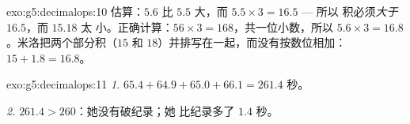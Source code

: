 \begin{solution}{exo:g5:decimalops:10}
估算：$5.6$ 比 $5.5$ 大，而 $5.5 \times 3 = 16.5$ --- 所以
积必须\emph{大于} $16.5$，而 $15.18$ 太
小。正确计算：$56 \times 3 = 168$，共一位小数，所以
$5.6 \times 3 = 16.8$。米洛把两个部分积（$15$ 和
$18$）并排写在一起，而没有按数位相加：
$15 + 1.8 = 16.8$。
\end{solution}

\begin{solution}{exo:g5:decimalops:11}
\emph{1.} $65.4 + 64.9 + 65.0 + 66.1 = 261.4$ 秒。

\emph{2.} $261.4 > 260$：她没有破纪录；她
比纪录多了 $1.4$ 秒。
\end{solution}
